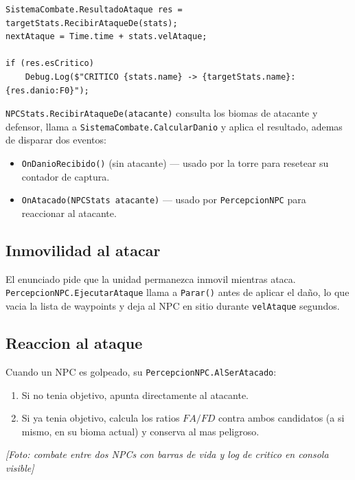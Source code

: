 \documentclass[12pt,a4paper]{article}
\newcommand{\fotoplaceholder}[1]{%
    \par\medskip\noindent%
    \begin{center}%
    \begin{tcolorbox}[
        colback=fotobg,
        colframe=fotoborder,
        boxrule=0.8pt,
        arc=2pt,
        width=0.85\textwidth,
        halign=center,
        valign=center,
        height=2.4cm
    ]
    \itshape\color{gray} [Foto: #1]
    \end{tcolorbox}%
    \end{center}\medskip%
}
\begin{document}
\begin{lstlisting}[caption={Llamada al sistema de combate desde PercepcionNPC.cs}]
SistemaCombate.ResultadoAtaque res = targetStats.RecibirAtaqueDe(stats);
nextAtaque = Time.time + stats.velAtaque;

if (res.esCritico)
    Debug.Log($"CRITICO {stats.name} -> {targetStats.name}: {res.danio:F0}");
\end{lstlisting}

\texttt{NPCStats.RecibirAtaqueDe(atacante)} consulta los biomas de
atacante y defensor, llama a \texttt{SistemaCombate.CalcularDanio} y
aplica el resultado, ademas de disparar dos eventos:

\begin{itemize}[leftmargin=1.5em]
    \item \texttt{OnDanioRecibido()} (sin atacante) — usado por la torre para resetear su contador de captura.
    \item \texttt{OnAtacado(NPCStats atacante)} — usado por \texttt{PercepcionNPC} para reaccionar al atacante.
\end{itemize}

\subsection{Inmovilidad al atacar}

El enunciado pide que la unidad permanezca inmovil mientras ataca.
\texttt{PercepcionNPC.EjecutarAtaque} llama a \texttt{Parar()} antes de
aplicar el daño, lo que vacia la lista de waypoints y deja al NPC en
sitio durante \texttt{velAtaque} segundos.

\subsection{Reaccion al ataque}

Cuando un NPC es golpeado, su \texttt{PercepcionNPC.AlSerAtacado}:

\begin{enumerate}[leftmargin=1.5em]
    \item Si no tenia objetivo, apunta directamente al atacante.
    \item Si ya tenia objetivo, calcula los ratios $FA/FD$ contra ambos candidatos (a si mismo, en su bioma actual) y conserva al mas peligroso.
\end{enumerate}

\fotoplaceholder{combate entre dos NPCs con barras de vida y log de critico en consola visible}
\end{document}
